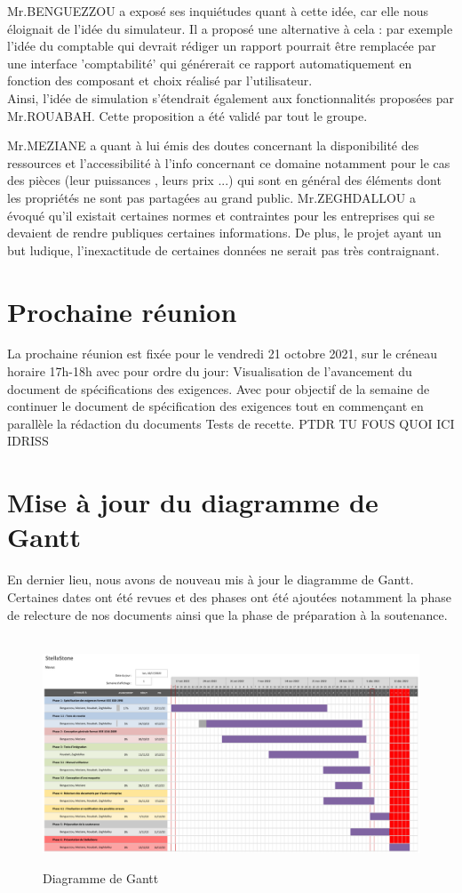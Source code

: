 \documentclass[a4paper, 12pt]{article}
\begin{document}
Mr.BENGUEZZOU a exposé ses inquiétudes quant à cette idée, car elle nous éloignait de l'idée du simulateur. Il a proposé une alternative à cela : par exemple l'idée du comptable qui devrait rédiger un rapport pourrait être remplacée par une interface 'comptabilité' qui générerait ce rapport automatiquement en fonction des composant et choix réalisé par l'utilisateur. 
\\ Ainsi, l'idée de simulation s'étendrait également aux fonctionnalités proposées par Mr.ROUABAH. Cette proposition a été validé par tout le groupe.

Mr.MEZIANE a quant à lui émis des doutes concernant la disponibilité des ressources et l'accessibilité à l'info concernant ce domaine notamment pour le cas des pièces (leur puissances , leurs prix ...) qui sont en général des éléments dont les propriétés ne sont pas partagées au grand public. Mr.ZEGHDALLOU a évoqué qu'il existait certaines normes et contraintes pour les entreprises qui se devaient de rendre publiques certaines informations. De plus, le projet ayant un but ludique, l'inexactitude de certaines données ne serait pas très contraignant.


\section{Prochaine réunion}
La prochaine réunion est fixée pour le vendredi 21 octobre 2021, sur le créneau horaire 17h-18h avec pour ordre du jour: Visualisation de l'avancement du document de spécifications des exigences. Avec pour objectif de la semaine de continuer le document de spécification des exigences tout en commençant en parallèle la rédaction du documents Tests de recette. PTDR TU FOUS QUOI ICI IDRISS
\section{Mise à jour du diagramme de Gantt} 

En dernier lieu, nous avons de nouveau mis à jour le diagramme de Gantt.
Certaines dates ont été revues et des phases ont été ajoutées notamment la phase de relecture de nos documents ainsi que la phase de préparation à la soutenance.
\\\\
 \begin{figure}[!h]
    \centering
    \includegraphics[scale=0.5]{Diagramme de gantt.png}
    \label{fig:Tache_semaine}
    \caption{Diagramme de Gantt}
\end{figure}
\end{document}
